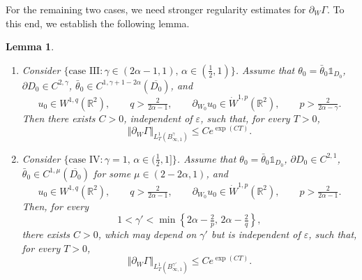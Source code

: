 \documentclass[reqno,11pt,a4paper]{amsart}
\newtheorem{lemma}[theorem]{Lemma}
\begin{document}
For the remaining two cases, we need stronger regularity
estimates for $\partial_W\Gamma$.
To this end, we establish the following lemma.

\begin{lemma}\label{lem:pGamma-high}
\begin{enumerate}[(1)]
\item
Consider $\{\textrm{case III}: \gamma\in(2\alpha-1,1), \,\alpha\in(\frac{1}{2},1)\}$.
Assume that
$\theta_0=\bar\theta_0\mathds{1}_{D_0}$,
$\partial D_0\in C^{2,\gamma}$,
$\bar\theta_0\in
C^{1,\gamma+1-2\alpha}(\overline{D_0})$,
and
\[
  u_0\in W^{1,q}(\mathbb R^2),
  \qquad q>\tfrac{2}{2\alpha-1},
  \qquad
  \partial_{W_0}u_0\in\dot W^{1,p}(\mathbb R^2),
  \qquad p>\tfrac{2}{2\alpha-\gamma}.
\]
Then there exists $C>0$, independent of $\varepsilon$,
such that, for every $T>0$,
\begin{equation}\label{es:pGamma-high1}
  \Vert \partial_W\Gamma\Vert _{L^1_T(B^\gamma_{\infty,1})}
  \leq Ce^{\exp(CT)}.
\end{equation}

\item
Consider $\{\textrm{case IV}:\gamma=1, \,\alpha\in(\frac{1}{2},1]\}$.
Assume that
$\theta_0=\bar\theta_0\mathds{1}_{D_0}$,
$\partial D_0\in C^{2,1}$,
$\bar\theta_0\in C^{1,\mu}(\overline{D_0})$
for some $\mu\in(2-2\alpha,1)$, and
\[
  u_0\in W^{1,q}(\mathbb R^2),
  \qquad q>\tfrac{2}{2\alpha-1},
  \qquad
  \partial_{W_0}u_0\in\dot W^{1,p}(\mathbb R^2),
  \qquad p>\tfrac{2}{2\alpha-1}.
\]
Then, for every
\[
  1<\gamma'
  <\min\left\{2\alpha-\tfrac2p,\,2\alpha-\tfrac2q\right\},
\]
there exists $C>0$, which may depend on $\gamma'$
but is independent of $\varepsilon$, such that,
for every $T>0$,
\begin{equation}\label{es:pGamma-high2}
  \Vert \partial_W\Gamma\Vert _{L^1_T(B^{\gamma'}_{\infty,1})}
  \leq Ce^{\exp(CT)}.
\end{equation}
\end{enumerate}
\end{lemma}
\end{document}
